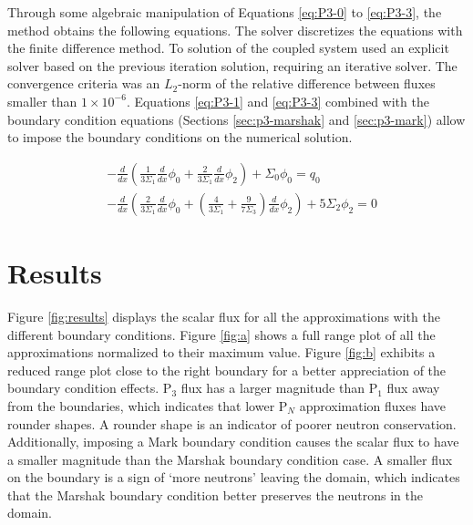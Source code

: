 \documentclass[letterpaper]{article}
\begin{document}
Through some algebraic manipulation of Equations \ref{eq:P3-0} to \ref{eq:P3-3}, the method obtains the following equations.
The solver discretizes the equations with the finite difference method.
To solution of the coupled system used an explicit solver based on the previous iteration solution, requiring an iterative solver.
The convergence criteria was an $L_2$-norm of the relative difference between fluxes smaller than $1 \times 10^{-6}$.
Equations \ref{eq:P3-1} and \ref{eq:P3-3} combined with the boundary condition equations (Sections \ref{sec:p3-marshak} and \ref{sec:p3-mark}) allow to impose the boundary conditions on the numerical solution.

\begin{align}
    & -\frac{d}{dx}\left(\frac{1}{3\Sigma_1} \frac{d}{dx}\phi_0 + \frac{2}{3\Sigma_1} \frac{d}{dx}\phi_2 \right) + \Sigma_0 \phi_0 = q_0   \\
    & -\frac{d}{dx}\left(\frac{2}{3\Sigma_1} \frac{d}{dx}\phi_0 + \left(\frac{4}{3\Sigma_1} + \frac{9}{7\Sigma_3} \right) \frac{d}{dx}\phi_2 \right) + 5 \Sigma_2 \phi_2 = 0
\end{align}

\section{Results}

Figure \ref{fig:results} displays the scalar flux for all the approximations with the different boundary conditions.
Figure \ref{fig:a} shows a full range plot of all the approximations normalized to their maximum value.
Figure \ref{fig:b} exhibits a reduced range plot close to the right boundary for a better appreciation of the boundary condition effects.
P$_3$ flux has a larger magnitude than P$_1$ flux away from the boundaries, which indicates that lower P$_N$ approximation fluxes have rounder shapes.
A rounder shape is an indicator of poorer neutron conservation.
Additionally, imposing a Mark boundary condition causes the scalar flux to have a smaller magnitude than the Marshak boundary condition case.
A smaller flux on the boundary is a sign of `more neutrons' leaving the domain, which indicates that the Marshak boundary condition better preserves the neutrons in the domain.
\end{document}
